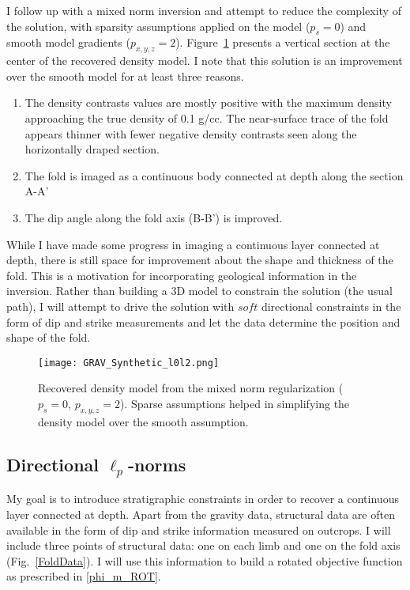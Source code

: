 I follow up with a mixed norm inversion and attempt to reduce the complexity of the solution, with sparsity assumptions applied on the model ($p_s=0$) and smooth model gradients ($p_{x,y,z} = 2$). Figure~\ref{Synthetic_Fold_lpModel} presents a vertical section at the center of the recovered density model. I note that this solution is an improvement over the smooth model for at least three reasons.
\begin{enumerate}
\item The density contrasts values are mostly positive with the maximum density approaching the true density of 0.1 g/cc. The near-surface trace of the fold appears thinner with fewer negative density contrasts seen along the horizontally draped section.
\item The fold is imaged as a continuous body connected at depth along the section A-A'
\item The dip angle along the fold axis (B-B') is improved.
\end{enumerate}
While I have made some progress in imaging a continuous layer connected at depth, there is still space for improvement about the shape and thickness of the fold. This is a motivation for incorporating geological information in the inversion. Rather than building a 3D model to constrain the solution (the usual path), I will attempt to drive the solution with $soft$ directional constraints in the form of dip and strike measurements and let the data determine the position and shape of the fold.

\begin{figure}[h!]
\centering
\texttt{[image: GRAV\_Synthetic\_l0l2.png]}
\caption{Recovered density model from the mixed norm regularization ($p_s=0$, $p_{x,y,z} = 2$). Sparse assumptions helped in simplifying the density model over the smooth assumption.}\label{Synthetic_Fold_lpModel}
\end{figure}

\subsection{Directional $\ell_p$-norms}
My goal is to introduce stratigraphic constraints in order to recover a continuous layer connected at depth.
Apart from the gravity data, structural data are often available in the form of dip and strike information measured on outcrops. I will include three points of structural data: one on each limb and one on the fold axis (Fig.~\ref{FoldData}).
I will use this information to build a rotated objective function as prescribed in \eqref{phi_m_ROT}.

